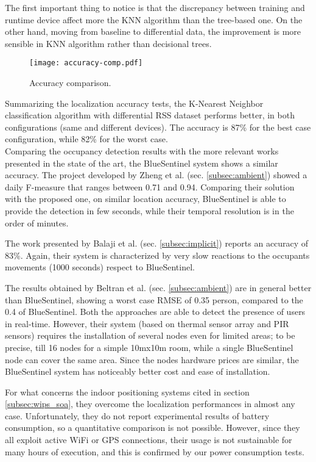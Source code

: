 The first important thing to notice is that the discrepancy between training and runtime device affect more the KNN algorithm than the tree-based one. On the other hand, moving from baseline to differential data, the improvement is more sensible in KNN algorithm rather than decisional trees.


\begin{figure}[h!tb]
\centering\texttt{[image: accuracy-comp.pdf]}
\caption{Accuracy comparison.}
\label{fig:accuracy-comp}
\end{figure}

Summarizing the localization accuracy tests, the K-Nearest Neighbor classification algorithm with differential RSS dataset performs better, in both configurations (same and different devices). The accuracy is 87\% for the best case configuration, while 82\% for the worst case.\\
Comparing the occupancy detection results with the more relevant works presented in the state of the art, the BlueSentinel system shows a similar accuracy.
The project developed by Zheng et al. \cite{Cossio2012} (sec. \ref{subsec:ambient}) showed a daily F-measure that ranges between 0.71 and 0.94. Comparing their solution with the proposed one, on similar location accuracy, BlueSentinel is able to provide the detection in few seconds, while their temporal resolution is in the order of minutes.

 The work presented by Balaji et al. \cite{Balaji2013} (sec. \ref{subsec:implicit}) reports an accuracy of 83\%. Again, their system is characterized by very slow reactions to the occupants movements (1000 seconds) respect to BlueSentinel.

The results obtained by Beltran et al. \cite{Beltran2013} (sec. \ref{subsec:ambient}) are in general better than BlueSentinel, showing a worst case RMSE of 0.35 person, compared to the 0.4 of BlueSentinel. Both the approaches are able to detect the presence of users in real-time. However, their system (based on thermal sensor array and PIR sensors) requires the installation of several nodes even for limited areas; to be precise, till 16 nodes for a simple 10mx10m room, while a single BlueSentinel node can cover the same area. Since the nodes hardware prices are similar, the BlueSentinel system has noticeably better cost and ease of installation.

For what concerns the indoor positioning systems cited in section \ref{subsec:wips_soa}, they overcome the localization performances in almost any case. Unfortunately, they do not report experimental results of battery consumption, so a quantitative comparison is not possible. However, since they all exploit active WiFi or GPS connections, their usage is not sustainable for many hours of execution, and this is confirmed by our power consumption tests.

